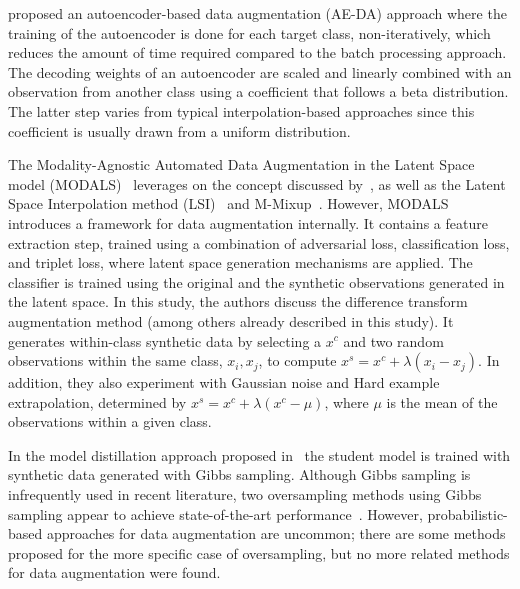 \cite{feng2020autuencoder} proposed an autoencoder-based data augmentation
(AE-DA) approach where the training of the autoencoder is done for each target
class, non-iteratively, which reduces the amount of time required compared to
the batch processing approach. The decoding weights of an autoencoder are
scaled and linearly combined with an observation from another class using a
coefficient that follows a beta distribution. The latter step varies from
typical interpolation-based approaches since this coefficient is usually
drawn from a uniform distribution.

The Modality-Agnostic Automated Data Augmentation in the Latent Space model
(MODALS)~\cite{cheung2020modals} leverages on the concept discussed
by~\cite{devries2017dataset}, as well as the Latent Space Interpolation
method (LSI)~\cite{liu2018data} and M-Mixup~\cite{verma2019manifold}.
However, MODALS introduces a framework for data augmentation internally. It
contains a feature extraction step, trained using a combination of adversarial
loss, classification loss, and triplet loss, where latent space generation
mechanisms are applied. The classifier is trained using the original and the
synthetic observations generated in the latent space. In this study, the
authors discuss the difference transform augmentation method (among others already
described in this study). It generates within-class synthetic data by
selecting a $x^c$ and two random observations within the same class, $x_i,
x_j$, to compute $x^s = x^c + \lambda (x_i-x_j)$. In addition, they also
experiment with Gaussian noise and Hard example extrapolation, determined by
$x^s = x^c + \lambda (x^c-\mu)$, where $\mu$ is the mean of the observations
within a given class.

In the model distillation approach proposed in~\cite{fakoor2020fast} the
student model is trained with synthetic data generated with Gibbs sampling.
Although Gibbs sampling is infrequently used in recent literature, two
oversampling methods using Gibbs sampling appear to achieve state-of-the-art
performance~\cite{das2014racog}. However, probabilistic-based approaches for
data augmentation are uncommon; there are some methods proposed for the more
specific case of oversampling, but no more related methods for data
augmentation were found.

